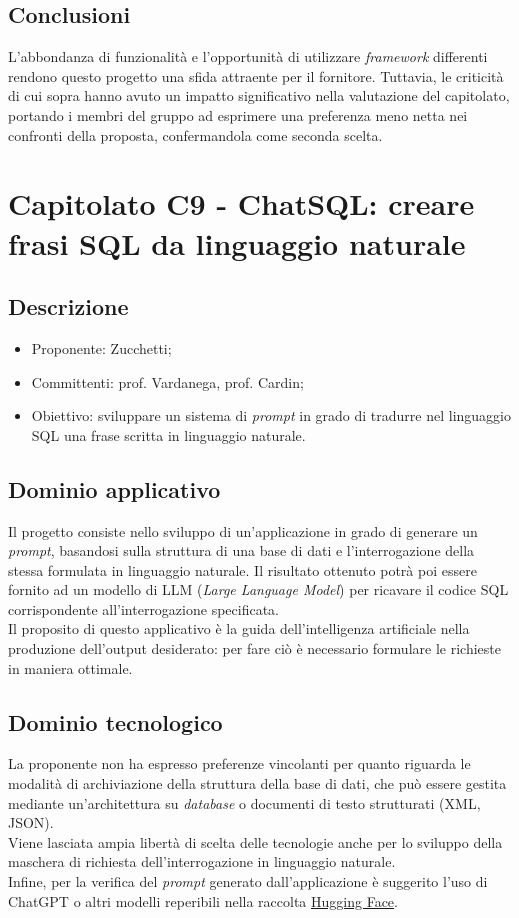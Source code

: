 \subsection{Conclusioni}
L'abbondanza di funzionalità e l'opportunità di utilizzare \textit{framework} differenti rendono questo progetto una sfida attraente per il fornitore. Tuttavia, le criticità di cui sopra hanno avuto un impatto significativo nella valutazione del capitolato, portando i membri del gruppo ad esprimere una preferenza meno netta nei confronti della proposta, confermandola come seconda scelta.

\newpage

\section{Capitolato C9 - ChatSQL: creare frasi SQL da linguaggio naturale} \label{sec:C9}
\subsection{Descrizione}
\begin{itemize}
    \setlength\itemsep{0em}
    \item Proponente: Zucchetti;
    \item Committenti: prof. Vardanega, prof. Cardin;
    \item Obiettivo: sviluppare un sistema di \textit{prompt} in grado di tradurre nel linguaggio SQL una frase scritta in linguaggio naturale.
\end{itemize}

\subsection{Dominio applicativo}
Il progetto consiste nello sviluppo di un'applicazione in grado di generare un \textit{prompt}, basandosi sulla struttura di una base di dati e l'interrogazione della stessa formulata in linguaggio naturale. Il risultato ottenuto potrà poi essere fornito ad un modello di LLM (\textit{Large Language Model}) per ricavare il codice SQL corrispondente all'interrogazione specificata. \\ Il proposito di questo applicativo è la guida dell'intelligenza artificiale nella produzione dell'output desiderato: per fare ciò è necessario formulare le richieste in maniera ottimale. 

\subsection{Dominio tecnologico}
La proponente non ha espresso preferenze vincolanti per quanto riguarda le modalità di archiviazione della struttura della base di dati, che può essere gestita mediante un'architettura su \textit{database} o documenti di testo strutturati (XML, JSON). \\ Viene lasciata ampia libertà di scelta delle tecnologie anche per lo sviluppo della maschera di richiesta dell'interrogazione in linguaggio naturale. \\ Infine, per la verifica del \textit{prompt} generato dall'applicazione è suggerito l'uso di ChatGPT o altri modelli reperibili nella raccolta \href{https://huggingface.co}{Hugging Face}.

